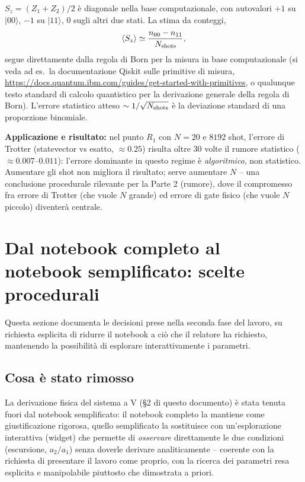 \documentclass[11pt,a4paper]{article}
\begin{document}
$S_z=(Z_1+Z_2)/2$ è diagonale nella base computazionale, con autovalori
$+1$ su $|00\rangle$, $-1$ su $|11\rangle$, $0$ sugli altri due stati.
La stima da conteggi,
$$\langle S_z\rangle \simeq \frac{n_{00}-n_{11}}{N_{\rm shots}},$$
segue direttamente dalla regola di Born per la misura in base computazionale
(si veda ad es.\ la documentazione Qiskit sulle primitive di misura,
\url{https://docs.quantum.ibm.com/guides/get-started-with-primitives}, o
qualunque testo standard di calcolo quantistico per la derivazione generale
della regola di Born). L'errore statistico atteso $\sim1/\sqrt{N_{\rm
shots}}$ è la deviazione standard di una proporzione binomiale.

\textbf{Applicazione e risultato:} nel punto $R_1$ con $N=20$ e $8192$
shot, l'errore di Trotter (statevector vs esatto, $\approx0.25$) risulta
oltre 30 volte il rumore statistico ($\approx0.007$--$0.011$): l'errore
dominante in questo regime è \emph{algoritmico}, non statistico. Aumentare
gli shot non migliora il risultato; serve aumentare $N$ -- una conclusione
procedurale rilevante per la Parte 2 (rumore), dove il compromesso fra
errore di Trotter (che vuole $N$ grande) ed errore di gate fisico (che
vuole $N$ piccolo) diventerà centrale.

\section{Dal notebook completo al notebook semplificato: scelte procedurali}

Questa sezione documenta le decisioni prese nella seconda fase del lavoro,
su richiesta esplicita di ridurre il notebook a ciò che il relatore ha
richiesto, mantenendo la possibilità di esplorare interattivamente i
parametri.

\subsection{Cosa è stato rimosso}

La derivazione fisica del sistema a V (\S2 di questo documento) è stata
tenuta fuori dal notebook semplificato: il notebook completo la mantiene
come giustificazione rigorosa, quello semplificato la sostituisce con
un'esplorazione interattiva (widget) che permette di \emph{osservare}
direttamente le due condizioni (escursione, $a_2/a_1$) senza doverle
derivare analiticamente -- coerente con la richiesta di presentare il
lavoro come proprio, con la ricerca dei parametri resa esplicita e
manipolabile piuttosto che dimostrata a priori.
\end{document}
